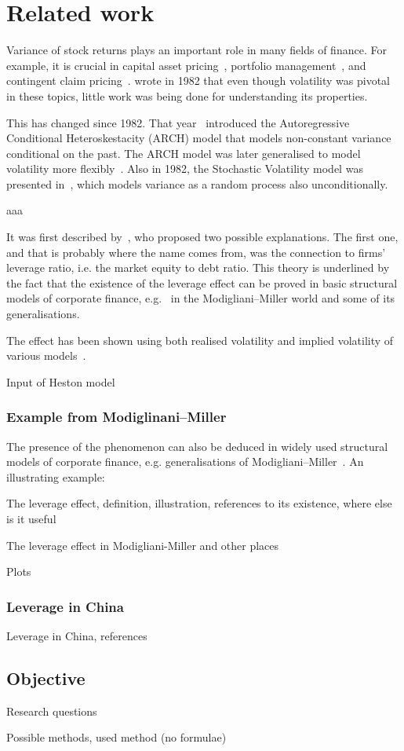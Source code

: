 \section{Related work}

Variance of stock returns plays an important role in many fields of finance.
For example, it is crucial in capital asset pricing~\citep{skiadas2009asset}, portfolio management~\citep{chow2014study}, and contingent claim pricing~\citep{hull1987pricing}.
\citeauthor{Christie1982} wrote in 1982 that even though volatility was pivotal in these topics, little work was being done for understanding its properties.

This has changed since 1982.
That year~\citet{Engle1982} introduced the Autoregressive Conditional Heteroskestacity (ARCH) model that models non-constant variance conditional on the past.
The ARCH model was later generalised to model volatility more flexibly~\citep{Bollerslev1986}.
Also in 1982, the Stochastic Volatility model was presented in~\citet{Taylor1982}, which models variance as a random process also unconditionally.

aaa

It was first described by~\citet{black1976studies}, who proposed two possible explanations.
The first one, and that is probably where the name comes from, was the connection to firms' leverage ratio, i.e. the market equity to debt ratio.
This theory is underlined by the fact that the existence of the leverage effect can be proved in basic structural models of corporate finance, e.g.~\citeauthor{Christie1982} in the Modigliani--Miller world and some of its generalisations.

The effect has been shown using both realised volatility and implied volatility of various models~\citep{Bouchaud2001,Harvey1996,Christie1982,french1987expected}.

Input of Heston model

\subsubsection{Example from Modiglinani--Miller}

The presence of the phenomenon can also be deduced in widely used structural models of corporate finance, e.g. generalisations of Modigliani--Miller~\citep{Christie1982}.
An illustrating example:  

The leverage effect, definition, illustration, references to its existence, where else is it useful

The leverage effect in Modigliani-Miller and other places

Plots

\subsubsection{Leverage in China}

Leverage in China, references

\subsection{Objective}

Research questions

Possible methods, used method (no formulae)